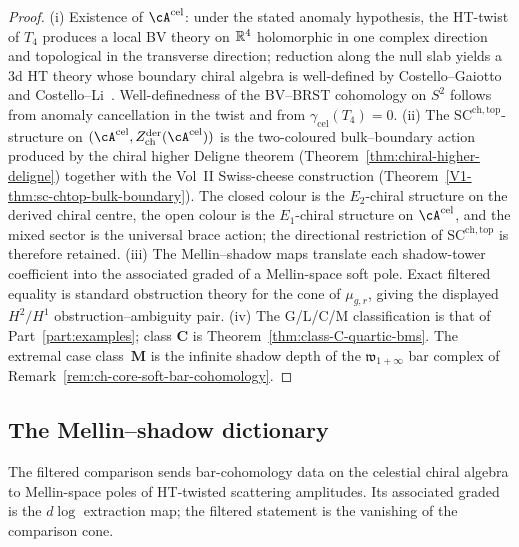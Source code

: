\begin{proof}
(i) Existence of $\cA^{\mathrm{cel}}$: under the stated anomaly
hypothesis, the HT-twist of $T_4$ produces a local BV theory on $\mathbb R^4$
holomorphic in one
complex direction and topological in the transverse direction; reduction
along the null slab yields a $3$d HT theory whose boundary chiral
algebra is well-defined by Costello--Gaiotto~\cite{CostelloGaiottoBoundaryVOA}
and Costello--Li~\cite{CL16}. Well-definedness of the
BV--BRST cohomology on $S^2$ follows from anomaly cancellation in the
twist and from $\gamma_{\mathrm{cel}}(T_4)=0$.
(ii) The $\mathrm{SC}^{\mathrm{ch,top}}$-structure on
$(\cA^{\mathrm{cel}}, Z^{\mathrm{der}}_{\mathrm{ch}}(\cA^{\mathrm{cel}}))$
is the two-coloured bulk--boundary action produced by the chiral
higher Deligne theorem (Theorem~\ref{thm:chiral-higher-deligne})
together with the Vol~II Swiss-cheese construction
(Theorem~\ref{V1-thm:sc-chtop-bulk-boundary}). The closed colour is
the $E_2$-chiral structure on the derived chiral centre, the open
colour is the $E_1$-chiral structure on $\cA^{\mathrm{cel}}$, and the
mixed sector is the universal brace action; the directional
restriction of $\mathrm{SC}^{\mathrm{ch,top}}$ is therefore retained.
(iii) The Mellin--shadow maps translate each shadow-tower coefficient
into the associated graded of a Mellin-space soft pole. Exact filtered equality is standard
obstruction theory for the cone of $\mu_{g,r}$, giving the displayed
$H^2/H^1$ obstruction--ambiguity pair.
(iv) The G/L/C/M classification is that of Part~\ref{part:examples};
class $\mathbf C$ is Theorem~\ref{thm:class-C-quartic-bms}. The
extremal case class~$\mathbf M$ is the infinite shadow depth of the
$\mathfrak{w}_{1+\infty}$ bar complex of Remark~\ref{rem:ch-core-soft-bar-cohomology}.
\end{proof}

\subsection{The Mellin--shadow dictionary}
\label{subsec:mellin-shadow-dictionary}

The filtered comparison sends bar-cohomology data on the celestial chiral algebra to Mellin-space poles of HT-twisted scattering amplitudes. Its associated graded is the $d\log$ extraction map; the filtered statement is the vanishing of the comparison cone.

